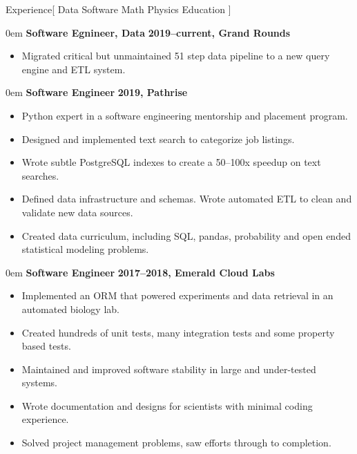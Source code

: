 \documentclass[11pt,a4paper]{article}
\newenvironment{headedsection}[2]{
    \begin{addmargin}[0.5em]{0em}
    {\large\bfseries #1} \hfill {\bfseries #2}%
    \begin{itemize}
        [label={}, topsep=0pt, itemsep=1.5pt, parsep=0pt, leftmargin=1.5em]
}{
    \end{itemize}
    \end{addmargin}
    \medskip
}
\begin{document}
\sloppy  %


\vspace{1em}

\begin{mysection}{Experience}[
    Data
    \textbullet{} Software
    \textbullet{} Math
    \textbullet{} Physics
    \textbullet{} Education
]

  \begin{headedsection}
        {Software Egnineer, Data}
        {2019--current, Grand Rounds}

    \item Migrated critical but unmaintained 51 step data pipeline to a new
          query engine and ETL system.

  \end{headedsection}

  \begin{headedsection}
        {Software Engineer}
        {2019, Pathrise}

    \item Python expert in a software engineering mentorship and placement
          program.
    \item Designed and implemented text search to categorize job listings.
    \item Wrote subtle PostgreSQL indexes to create a 50--100x speedup on text
          searches.
    \item Defined data infrastructure and schemas.
          Wrote automated ETL to clean and validate new data sources.
    \item Created data curriculum, including SQL, pandas, probability and open
          ended statistical modeling problems.

  \end{headedsection}

  \begin{headedsection}
        {Software Engineer}
        {2017--2018, Emerald Cloud Labs}

    \item Implemented an ORM that powered experiments and data retrieval in an
          automated biology lab.
    \item Created hundreds of unit tests, many integration tests and some
          property based tests.
    \item Maintained and improved software stability in large and under-tested
          systems.
    \item Wrote documentation and designs for scientists with minimal coding
          experience.
    \item Solved project management problems, saw efforts through to completion.


\end{headedsection}
\end{mysection}
\end{document}
